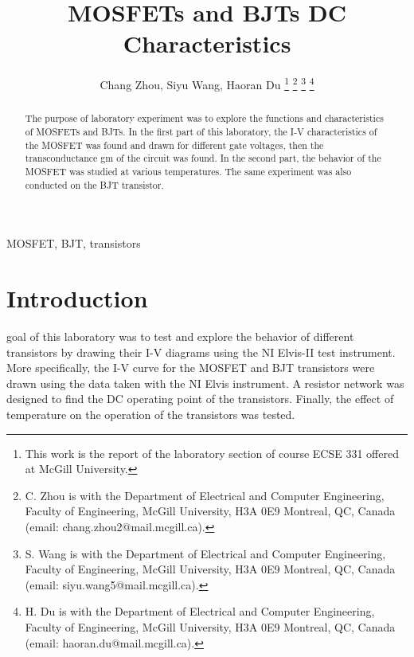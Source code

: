 \documentclass[journal]{IEEEtran}
\begin{document}
\begin{titlepage}

\end{titlepage}
\title{MOSFETs and BJTs DC Characteristics}
\author{Chang Zhou, Siyu Wang, Haoran Du
\thanks{This work is the report of the laboratory section of course ECSE 331 offered at McGill University.}
\thanks{C. Zhou is with the Department of Electrical and Computer
Engineering, Faculty of Engineering, McGill University, H3A 0E9 Montreal, QC, Canada
(email: chang.zhou2@mail.mcgill.ca).}
\thanks{S. Wang is with the Department of Electrical and Computer
Engineering, Faculty of Engineering, McGill University, H3A 0E9 Montreal, QC, Canada
(email: siyu.wang5@mail.mcgill.ca).}
\thanks{H. Du is with the Department of Electrical and Computer
Engineering, Faculty of Engineering, McGill University, H3A 0E9 Montreal, QC, Canada
(email: haoran.du@mail.mcgill.ca).}}

\maketitle
\begin{abstract}
  The purpose of laboratory experiment was to explore the functions
  and characteristics of MOSFETs and BJTs. In the first part of this laboratory,
  the I-V characteristics of the MOSFET was found and drawn for different gate voltages,
  then the transconductance gm of the circuit was found. In the second part,
  the behavior of the MOSFET was studied at various temperatures.
  The same experiment was also conducted on the BJT transistor.
\end{abstract}

\begin{IEEEkeywords}
  MOSFET, BJT, transistors
\end{IEEEkeywords}

\section{Introduction}

 goal of this laboratory was to test and explore the behavior of
 different transistors by drawing their I-V diagrams using the NI Elvis-II test instrument.
 More specifically, the I-V curve for the MOSFET and BJT transistors were drawn
 using the data taken with the NI Elvis instrument. A resistor network was designed
 to find the DC operating point of the transistors.
 Finally, the effect of temperature on the operation of the transistors was tested.
\end{document}
